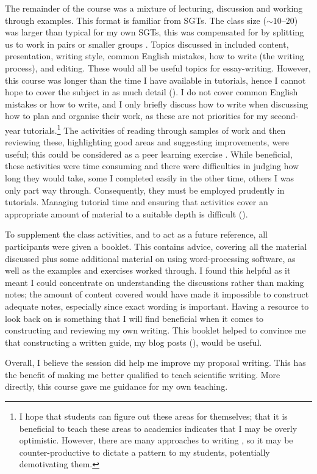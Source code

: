 The remainder of the course was a mixture of lecturing, discussion and working through examples. This format is familiar from SGTs. The class size ($\sim10$--$20$) was larger than typical for my own SGTs, this was compensated for by splitting us to work in pairs or smaller groups \citep{Ayres2015}. Topics discussed in included content, presentation, writing style, common English mistakes, how to write (the writing process), and editing. These would all be useful topics for essay-writing. However, this course was longer than the time I have available in tutorials, hence I cannot hope to cover the subject in as much detail (). I do not cover common English mistakes or how to write, and I only briefly discuss how to write when discussing how to plan and organise their work, as these are not priorities for my second-year tutorials.\footnote{I hope that students can figure out these areas for themselves; that it is beneficial to teach these areas to academics indicates that I may be overly optimistic. However, there are many approaches to writing \citep{Biggs1988}, so it may be counter-productive to dictate a pattern to my students, potentially demotivating them.} The activities of reading through samples of work and then reviewing these, highlighting good areas and suggesting improvements, were useful; this could be considered as a peer learning exercise \citep[chapter 1]{Falchikov2001}. While beneficial, these activities were time consuming and there were difficulties in judging how long they would take, some I completed easily in the other time, others I was only part way through. Consequently, they must be employed prudently in tutorials. Managing tutorial time and ensuring that activities cover an appropriate amount of material to a suitable depth is difficult ().

To supplement the class activities, and to act as a future reference, all participants were given a booklet. This contains advice, covering all the material discussed plus some additional material on using word-processing software, as well as the examples and exercises worked through. I found this helpful as it meant I could concentrate on understanding the discussions rather than making notes; the amount of content covered would have made it impossible to construct adequate notes, especially since exact wording is important. Having a resource to look back on is something that I will find beneficial when it comes to constructing and reviewing my own writing. This booklet helped to convince me that constructing a written guide, my blog posts (), would be useful.

Overall, I believe the session did help me improve my proposal writing. This has the benefit of making me better qualified to teach scientific writing. More directly, this course gave me guidance for my own teaching.
